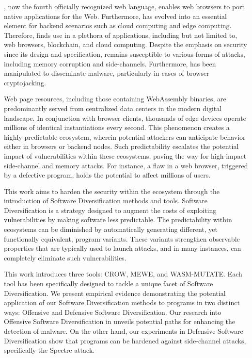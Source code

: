 \Wasm, now the fourth officially recognized web language, enables web browsers to port native applications for the Web. 
Furthermore, \Wasm has evolved into an essential element for backend scenarios such as cloud computing and edge computing. 
Therefore, \Wasm finds use in a plethora of applications, including but not limited to, web browsers, blockchain, and cloud computing. 
Despite the emphasis on security since its design and specification, \Wasm remains susceptible to various forms of attacks, including memory corruption and side-channels. 
Furthermore, \Wasm has been manipulated to disseminate malware, particularly in cases of browser cryptojacking. 

Web page resources, including those containing WebAssembly binaries, are predominantly served from centralized data centers in the modern digital landscape. 
In conjunction with browser clients, thousands of edge devices operate millions of identical \Wasm instantiations every second. 
This phenomenon creates a highly predictable ecosystem, wherein potential attackers can anticipate behavior either in browsers or backend nodes. 
Such predictability escalates the potential impact of vulnerabilities within these ecosystems, paving the way for high-impact side-channel and memory attacks. 
For instance, a flaw in a web browser, triggered by a defective \Wasm program, holds the potential to affect millions of users.


This work aims to harden the security within the \Wasm ecosystem through the introduction of Software Diversification methods and tools. 
Software Diversification is a strategy designed to augment the costs of exploiting vulnerabilities by making software less predictable.
The predictability within ecosystems can be diminished by automatically generating different, yet functionally equivalent, program variants. 
These variants strengthen observable properties that are typically used to launch attacks, and in many instances, can completely eliminate such vulnerabilities. 


This work introduces three tools: CROW, MEWE, and WASM-MUTATE. 
Each tool has been specifically designed to tackle a unique facet of Software Diversification. 
We present empirical evidence demonstrating the potential application of our Software Diversification methods to \Wasm programs in two distinct ways: Offensive and Defensive Software Diversification. 
Our research into Offensive Software Diversification in \Wasm unveils potential paths for enhancing the detection of \Wasm malware. 
On the other hand, our experiments in Defensive Software Diversification show that \Wasm programs can be hardened against side-channel attacks, specifically the Spectre attack.


